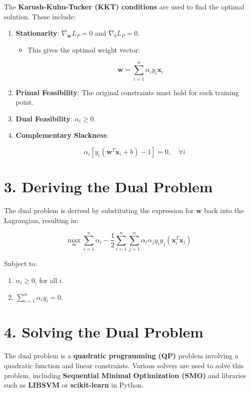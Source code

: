 \documentclass[
]{article}
\providecommand{\tightlist}{%
  \setlength{\itemsep}{0pt}\setlength{\parskip}{0pt}}
\begin{document}
The \textbf{Karush-Kuhn-Tucker (KKT) conditions} are used to find the
optimal solution. These include:

\begin{enumerate}
\def\labelenumi{\arabic{enumi}.}
\item
  \textbf{Stationarity}: \(\nabla_{\mathbf{w}} L_P = 0\) and
  \(\nabla_b L_P = 0\).

  \begin{itemize}
  \item
    This gives the optimal weight vector:

    \[
    \mathbf{w} = \sum_{i=1}^n \alpha_i y_i \mathbf{x}_i
    \]
  \end{itemize}
\item
  \textbf{Primal Feasibility}: The original constraints must hold for
  each training point.
\item
  \textbf{Dual Feasibility}: \(\alpha_i \geq 0\).
\item
  \textbf{Complementary Slackness}:

  \[
  \alpha_i \left[ y_i (\mathbf{w}^T \mathbf{x}_i + b) - 1 \right] = 0, \quad \forall i
  \]
\end{enumerate}

\section{3. Deriving the Dual Problem}\label{deriving-the-dual-problem}

The dual problem is derived by substituting the expression for
\(\mathbf{w}\) back into the Lagrangian, resulting in:

\[
\max_{\boldsymbol{\alpha}} \sum_{i=1}^n \alpha_i - \frac{1}{2} \sum_{i=1}^n \sum_{j=1}^n \alpha_i \alpha_j y_i y_j (\mathbf{x}_i^T \mathbf{x}_j)
\]

Subject to:

\begin{enumerate}
\def\labelenumi{\arabic{enumi}.}
\tightlist
\item
  \(\alpha_i \geq 0\), for all \(i\).
\item
  \(\sum_{i=1}^n \alpha_i y_i = 0\).
\end{enumerate}

\section{4. Solving the Dual Problem}\label{solving-the-dual-problem}

The dual problem is a \textbf{quadratic programming (QP)} problem
involving a quadratic function and linear constraints. Various solvers
are used to solve this problem, including \textbf{Sequential Minimal
Optimization (SMO)} and libraries such as \textbf{LIBSVM} or
\textbf{scikit-learn} in Python.
\end{document}
